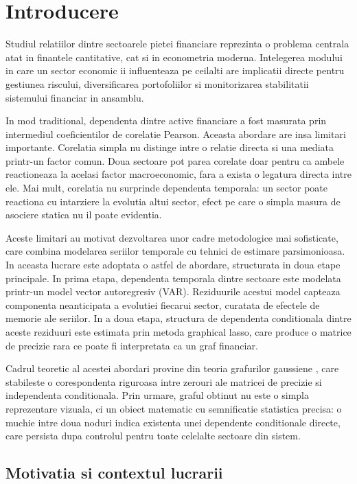 \chapter{Introducere}

Studiul relatiilor dintre sectoarele pietei financiare reprezinta o problema centrala
atat in finantele cantitative, cat si in econometria moderna. Intelegerea modului in
care un sector economic ii influenteaza pe ceilalti are implicatii directe pentru
gestiunea riscului, diversificarea portofoliilor si monitorizarea stabilitatii
sistemului financiar in ansamblu.

In mod traditional, dependenta dintre active financiare a fost masurata prin
intermediul coeficientilor de corelatie Pearson. Aceasta abordare are insa limitari
importante. Corelatia simpla nu distinge intre o relatie directa si una mediata
printr-un factor comun. Doua sectoare pot parea corelate doar pentru ca ambele
reactioneaza la acelasi factor macroeconomic, fara a exista o legatura directa
intre ele. Mai mult, corelatia nu surprinde dependenta temporala: un sector poate
reactiona cu intarziere la evolutia altui sector, efect pe care o simpla masura
de asociere statica nu il poate evidentia.

Aceste limitari au motivat dezvoltarea unor cadre metodologice mai sofisticate,
care combina modelarea seriilor temporale cu tehnici de estimare parsimonioasa.
In aceasta lucrare este adoptata o astfel de abordare, structurata in doua etape
principale. In prima etapa, dependenta temporala dintre sectoare este modelata
printr-un model vector autoregresiv (VAR). Reziduurile acestui model capteaza
componenta neanticipata a evolutiei fiecarui sector, curatata de efectele de
memorie ale seriilor. In a doua etapa, structura de dependenta conditionala
dintre aceste reziduuri este estimata prin metoda graphical lasso, care produce
o matrice de precizie rara ce poate fi interpretata ca un graf financiar.

Cadrul teoretic al acestei abordari provine din teoria grafurilor gaussiene
\cite{lauritzen1996}, care stabileste o corespondenta riguroasa intre zerouri
ale matricei de precizie si independenta conditionala. Prin urmare, graful
obtinut nu este o simpla reprezentare vizuala, ci un obiect matematic cu
semnificatie statistica precisa: o muchie intre doua noduri indica existenta
unei dependente conditionale directe, care persista dupa controlul pentru
toate celelalte sectoare din sistem.

\section{Motivatia si contextul lucrarii}

